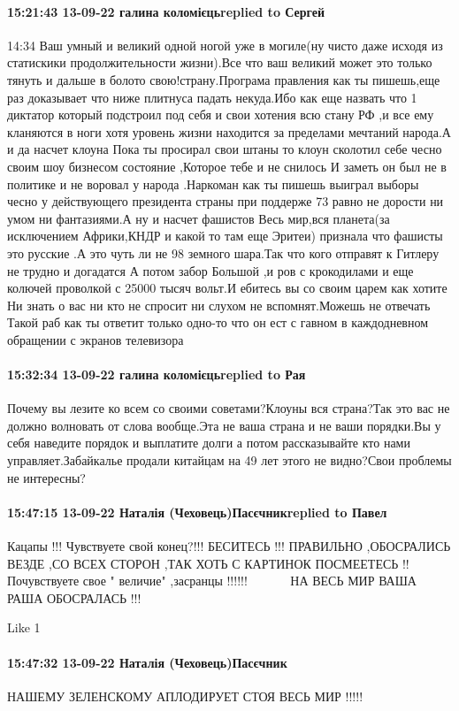 \paragraph{15:21:43 13-09-22 галина коломієцьreplied to Сергей}
14:34
Ваш умный и великий одной ногой уже в могиле(ну чисто даже исходя из статискики
продолжительности жизни).Все что ваш великий может это только тянуть и дальше в
болото свою!страну.Програма правления как ты пишешь,еще раз доказывает что ниже
плитнуса падать некуда.Ибо как еще назвать что 1 диктатор который подстроил под
себя и свои хотения всю стану РФ ,и все ему кланяются в ноги хотя уровень жизни
находится за пределами мечтаний народа.А и да насчет клоуна Пока ты просирал
свои штаны то клоун сколотил себе чесно своим шоу бизнесом состояние ,Которое
тебе и не снилось И заметь он был не в политике и не воровал у народа .Наркоман
как ты пишешь выиграл выборы чесно у действующего президента страны при
поддерже 73 %
равно не дорости ни умом ни фантазиями.А ну и насчет фашистов Весь мир,вся
планета(за исключением Африки,КНДР и какой то там еще Эритеи) признала что
фашисты это русские .А это чуть ли не 98%
земного шара.Так что кого отправят к Гитлеру не трудно и догадатся А потом
забор Большой ,и ров с крокодилами и еще колючей проволкой с 25000 тысяч
вольт.И ебитесь вы со своим царем как хотите Ни знать о вас ни кто не спросит
ни слухом не вспомнят.Можешь не отвечать Такой раб как ты ответит только
одно-то что он ест с гавном в каждодневном обращении с экранов телевизора

\paragraph{15:32:34 13-09-22 галина коломієцьreplied to Рая}

Почему вы лезите ко всем со своими советами?Клоуны вся страна?Так это вас не
должно волновать от слова вообще.Эта не ваша страна и не ваши порядки.Вы у себя
наведите порядок и выплатите долги а потом рассказывайте кто нами
управляет.Забайкалье продали китайцам на 49 лет этого не видно?Свои проблемы не
интересны?


\paragraph{15:47:15 13-09-22 Наталія (Чеховець)Пасєчникreplied to Павел}

Кацапы !!! Чувствуете свой конец?!!! БЕСИТЕСЬ !!! ПРАВИЛЬНО ,ОБОСРАЛИСЬ ВЕЗДЕ
,СО ВСЕХ СТОРОН ,ТАК ХОТЬ С КАРТИНОК ПОСМЕЕТЕСЬ !! Почувствуете свое " величие"
,засранцы !!!!!! 🤣🤣🤣🤣🤣🤣🤣🤣🤣🤣 НА ВЕСЬ МИР ВАША РАША ОБОСРАЛАСЬ !!!

    Like 1

\paragraph{15:47:32 13-09-22 Наталія (Чеховець)Пасєчник}
НАШЕМУ ЗЕЛЕНСКОМУ АПЛОДИРУЕТ СТОЯ ВЕСЬ МИР !!!!!
